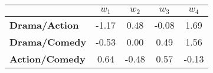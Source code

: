 \begin{tabular}{|l|c|c|c|c|}
\hline
&\textbf{$w_{1}$}&\textbf{$w_{2}$}&\textbf{$w_{3}$}&\textbf{$w_{4}$}\\\hline
\textbf{Drama/Action}&-1.17&0.48&-0.08&1.69\\\hline
\textbf{Drama/Comedy}&-0.53&0.00&0.49&1.56\\\hline
\textbf{Action/Comedy}&0.64&-0.48&0.57&-0.13\\\hline
\end{tabular}
